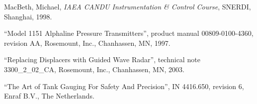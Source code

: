 \noindent
MacBeth, Michael, \textit{IAEA CANDU Instrumentation \& Control Course}, SNERDI, Shanghai, 1998. 

\vskip 10pt

\noindent
``Model 1151 Alphaline Pressure Transmitters'', product manual 00809-0100-4360, revision AA, Rosemount, Inc., Chanhassen, MN, 1997.

\vskip 10pt

\noindent
``Replacing Displacers with Guided Wave Radar'', technical note 3300\_2\_02\_CA, Rosemount, Inc., Chanhassen, MN, 2003.

\vskip 10pt

\noindent
``The Art of Tank Gauging For Safety And Precision'', IN 4416.650, revision 6, Enraf B.V., The Netherlands.










